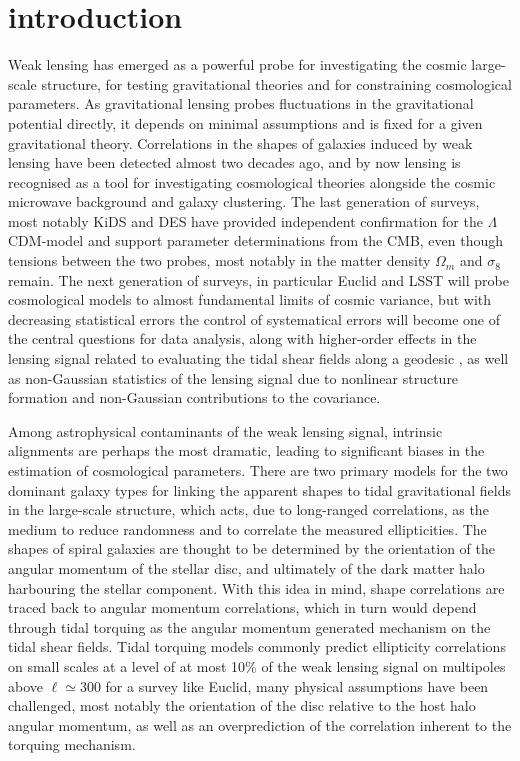 \documentclass[a4paper,fleqn,usenatbib]{mnras}
\begin{document}
\section{introduction}\label{sect_intro}
Weak lensing has emerged as a powerful probe for investigating the cosmic large-scale structure, for testing gravitational theories and for constraining cosmological parameters. As gravitational lensing probes fluctuations in the gravitational potential directly, it depends on minimal assumptions and is fixed for a given gravitational theory. Correlations in the shapes of galaxies induced by weak lensing have been detected almost two decades ago, and by now lensing is recognised as a tool for investigating cosmological theories alongside the cosmic microwave background and galaxy clustering. The last generation of surveys, most notably KiDS and DES \citep{Abbott:2017wau} have provided independent confirmation for the $\Lambda$CDM-model and support parameter determinations from the CMB, even though tensions between the two probes, most notably in the matter density $\Omega_m$ and $\sigma_8$ remain. The next generation of surveys, in particular Euclid \citep{Amendola:2016saw} and LSST will probe cosmological models to almost fundamental limits of cosmic variance, but with decreasing statistical errors the control of systematical errors will become one of the central questions for data analysis, along with higher-order effects in the lensing signal related to evaluating the tidal shear fields along a geodesic \citep{Ghosh:2018nsm}, as well as non-Gaussian statistics of the lensing signal due to nonlinear structure formation and non-Gaussian contributions to the covariance.

Among astrophysical contaminants of the weak lensing signal, intrinsic alignments are perhaps the most dramatic, leading to significant biases in the estimation of cosmological parameters. There are two primary models for the two dominant galaxy types for linking the apparent shapes to tidal gravitational fields in the large-scale structure, which acts, due to long-ranged correlations, as the medium to reduce randomness and to correlate the measured ellipticities. The shapes of spiral galaxies are thought to be determined by the orientation of the angular momentum of the stellar disc, and ultimately of the dark matter halo harbouring the stellar component. With this idea in mind, shape correlations are traced back to angular momentum correlations, which in turn would depend through tidal torquing as the angular momentum generated mechanism on the tidal shear fields. Tidal torquing models commonly predict ellipticity correlations on small scales at a level of at most 10\% of the weak lensing signal on multipoles above $\ell\simeq300$ for a survey like Euclid, many physical assumptions have been challenged, most notably the orientation of the disc relative to the host halo angular momentum, as well as an overprediction of the correlation inherent to the torquing mechanism.
\end{document}
